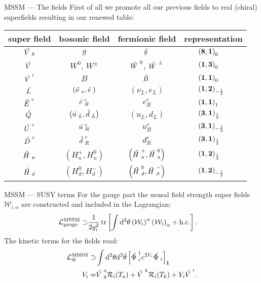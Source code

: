 \begin{frame}{MSSM — The fields}
First of all we promote all our previous fields to real (chiral) superfields resulting in our renewed table:\vfill
\begin{table}
\begin{tabular}{cccl}
  super field& bosonic field& fermionic field& representation\\\hline
  $\myhat{V}_8$& $g$& $\mytilde{g}$& $\quad\quad\left(\mathbf{8}, \mathbf{1}\right)_{0}$\\
  $\myhat{V}$& $W^0$, $W^\pm$& $\mytilde{W}^0$, $\mytilde{W}^\pm$& $\quad\quad\left(\mathbf{1}, \mathbf{3}\right)_{0}$\\
  $\myhat{V}'$& $B$& $\mytilde{B}$& $\quad\quad\left(\mathbf{1}, \mathbf{1}\right)_{0}$\\
  $\myhat{L}$& $\left(\mytilde{\nu}_e, \mytilde{e}\right)$& $\left(\nu_L, e_L\right)$& $\quad\quad\left(\mathbf{1}, \mathbf{2}\right)_{-\frac12}$\\
  $\myhat{E}^c$& $\mytilde{e}_R^c$& $e_R^c$& $\quad\quad\left(\mathbf{1}, \mathbf{1}\right)_{1}$\\
  $\myhat{Q}$& $\left(\mytilde{u}_L, \mytilde{d}_L\right)$& $\left(u_L, d_L\right)$& $\quad\quad\left(\mathbf{3}, \mathbf{1}\right)_{\frac16}$\\
  $\myhat{U}^c$& $\mytilde{u}_R^c$& $u_R^c$& $\quad\quad\left(\mathbf{3}, \mathbf{1}\right)_{-\frac23}$\\
  $\myhat{D}^c$& $\mytilde{d}_R^c$& $d_R^c$& $\quad\quad\left(\mathbf{3}, \mathbf{1}\right)_{\frac13}$\\
  $\myhat{H}_u$& $\left(H_u^+, H_u^0\right)$& $\left(\mytilde{H}_u^+, \mytilde{H}_u^0\right)$& $\quad\quad\left(\mathbf{1}, \mathbf{2}\right)_{\frac12}$\\
  $\myhat{H}_d$& $\left(H_d^0, H_d^-\right)$& $\left(\mytilde{H}^0_d, \mytilde{H}_d^-\right)$& $\quad\quad\left(\mathbf{1}, \mathbf{2}\right)_{-\frac12}$
\end{tabular}
\end{table}
\end{frame}

\begin{frame}{MSSM — SUSY terms}
For the gauge part the ususal field strength super fields $\mathcal{W}_{i, \alpha}$ are constructed and included in the Lagrangian:
\begin{align}
  \mathcal{L}^\mathrm{MSSM}_\mathrm{gauge}\supset&\frac1{2g_i^2}\tr\left[\int\dd^2\theta\left(\mathcal{W}_i\right)^\alpha\left(\mathcal{W}_i\right)_\alpha+\mathrm{h. c.}\right].
\end{align}
The kinetic terms for the fields read:
\begin{align}
  \mathcal{L}^\mathrm{MSSM}_K\supset&\int\dd^2\theta\dd^2\bar{\theta}\left[\myhat{\Phi}^\dagger_ie^{2V_i}\myhat{\Phi}_i\right]_\numb{1}\\
  V_i=&\myhat{V}_8^a\mathcal{R}_i(T_a)+\myhat{V}^k\mathcal{R}_i(T_k)+Y_i\myhat{V}'.
\end{align}
\end{frame}

